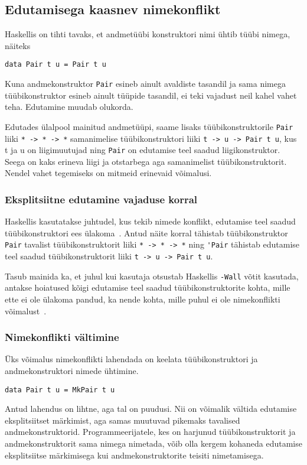 \documentclass[12pt]{article}
\begin{document}
    \subsection{Edutamisega kaasnev nimekonflikt}
      Haskellis on tihti tavaks, et andmetüübi konstruktori nimi ühtib tüübi nimega, näiteks

      \begin{verbatim}data Pair t u = Pair t u\end{verbatim}

      Kuna andmekonstruktor \verb!Pair! esineb ainult avaldiste tasandil ja sama nimega tüübikonstruktor esineb ainult tüüpide tasandil, ei teki vajadust neil kahel vahet teha. Edutamine muudab olukorda.

      Edutades ülalpool mainitud andmetüüpi, saame lisaks tüübikonstruktorile \verb!Pair! liiki \verb!* -> * -> *! samanimelise tüübikonstruktori liiki \verb!t -> u -> Pair t u!, kus t ja u on liigimuutujad ning \verb!Pair! on edutamise teel saadud liigikonstruktor. Seega on kaks erineva liigi ja otstarbega aga samanimelist tüübikonstruktorit. Nendel vahet tegemiseks on mitmeid erinevaid võimalusi.
      \subsubsection{Eksplitsiitne edutamine vajaduse korral}
        Haskellis kasutatakse juhtudel, kus tekib nimede konflikt, edutamise teel saadud tüübikonstruktori ees ülakoma~\cite{Giv}. Antud näite korral tähistab tüübikonstruktor \verb!Pair! tavalist tüübikonstruktorit liiki \verb!* -> * -> *! ning \verb!'Pair! tähistab edutamise teel saadud tüübikonstruktorit liiki \verb!t -> u -> Pair t u!.

        Tasub mainida ka, et juhul kui kasutaja otsustab Haskellis \verb!-Wall! võtit kasutada, antakse hoiatused kõigi edutamise teel saadud tüübikonstruktorite kohta, mille ette ei ole ülakoma pandud, ka nende kohta, mille puhul ei ole nimekonflikti võimalust~\cite{Gla}.
      \subsubsection{Nimekonflikti vältimine}
        Üks võimalus nimekonflikti lahendada on keelata tüübikonstruktori ja andmekonstruktori nimede ühtimine.

        \begin{verbatim}data Pair t u = MkPair t u\end{verbatim}

        Antud lahendus on lihtne, aga tal on puudusi. Nii on võimalik vältida edutamise eksplitsiitset märkimist, aga samas muutuvad pikemaks tavalised andmekonstruktorid. Programmeerijatele, kes on harjunud tüübikonstruktorit ja andmekonstruktorit sama nimega nimetada, võib olla kergem kohaneda edutamise eksplitsiitse märkimisega kui andmekonstruktorite teisiti nimetamisega.
\end{document}
